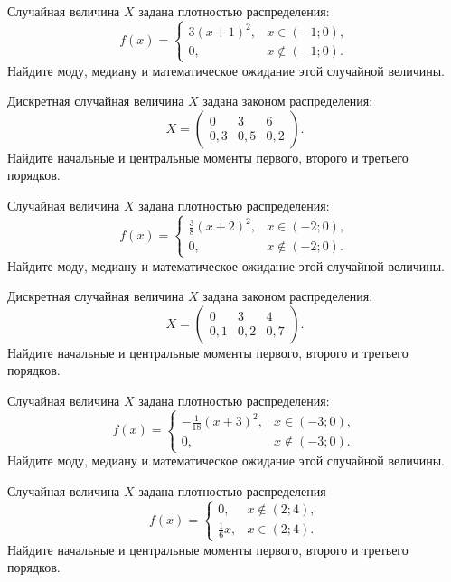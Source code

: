 \vfill

\newpage\setcounter{zad}{0}

\z Случайная величина $X$ задана плотностью распределения: $$f(x) = \begin{cases} 3(x+1)^2, & x \in (-1; 0), \\ 0, & x \not\in (-1; 0). \end{cases}$$ Найдите моду, медиану и математическое ожидание этой случайной величины.


\vfill

\z Дискретная случайная величина $X$ задана законом распределения: $$ X = \left(\begin{array}{rrr}0 & 3 & 6\\0{,}3 & 0{,}5 & 0{,}2\end{array}\right).$$ Найдите начальные и центральные моменты первого, второго и третьего порядков.
 

\vfill

\newpage\setcounter{zad}{0}

\z Случайная величина $X$ задана плотностью распределения: $$f(x) = \begin{cases} \frac{3}{8}(x+2)^2, & x \in (-2; 0), \\ 0, & x \not\in (-2; 0). \end{cases}$$ Найдите моду, медиану и математическое ожидание этой случайной величины.


\vfill

\z Дискретная случайная величина $X$ задана законом распределения: $$ X = \left(\begin{array}{rrr}0 & 3 & 4\\0{,}1 & 0{,}2 & 0{,}7\end{array}\right).$$ Найдите начальные и центральные моменты первого, второго и третьего порядков.
 

\vfill

\newpage\setcounter{zad}{0}

\z Случайная величина $X$ задана плотностью распределения: $$f(x) = \begin{cases} -\frac{1}{18}(x+3)^2, & x \in (-3; 0), \\ 0, & x \not\in (-3; 0). \end{cases}$$ Найдите моду, медиану и математическое ожидание этой случайной величины.


\vfill

\z Случайная величина $X$ задана плотностью распределения $$f(x) = \begin{cases}0, & x\not\in(2; 4), \\ \frac{1}{6}x, & x\in(2; 4).\end{cases}$$ Найдите начальные и центральные моменты первого, второго и третьего порядков.
 

